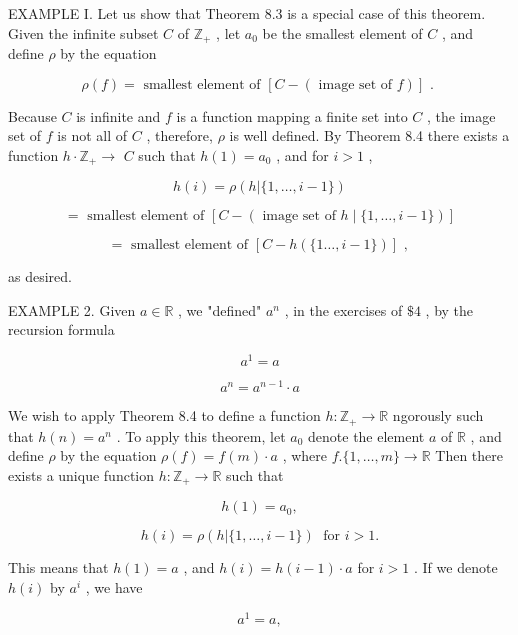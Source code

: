 EXAMPLE I. Let us show that Theorem 8.3 is a special case of this theorem. Given the infinite subset \(C\) of \({\mathbb{Z}}_{ + }\) , let \({a}_{0}\) be the smallest element of \(C\) , and define \(\rho\) by the equation

\[
\rho \left( f\right)  = \text{ smallest element of }\left\lbrack  {C - \left( {\text{ image set of }f}\right) }\right\rbrack  \text{ . }
\]

Because \(C\) is infinite and \(f\) is a function mapping a finite set into \(C\) , the image set of \(f\) is not all of \(C\) , therefore, \(\rho\) is well defined. By Theorem 8.4 there exists a function \(h \cdot  {\mathbb{Z}}_{ + } \rightarrow\)  \(C\) such that \(h\left( 1\right)  = {a}_{0}\) , and for \(i > 1\) ,

\[
h\left( i\right)  = \rho \left( {h|\{ 1,\ldots ,i - 1\} }\right)
\]

\[
= \text{ smallest element of }\left\lbrack  {C - \left( {\text{ image set of }h \mid  \{ 1,\ldots ,i - 1\} }\right) }\right\rbrack
\]

\[
= \text{ smallest element of }\left\lbrack  {C - h\left( {\{ 1\ldots ,i - 1\} }\right) }\right\rbrack  \text{ , }
\]

as desired.

EXAMPLE 2. Given \(a \in  \mathbb{R}\) , we "defined" \({a}^{n}\) , in the exercises of \(\$ 4\) , by the recursion formula

\[
{a}^{1} = a
\]

\[
{a}^{n} = {a}^{n - 1} \cdot  a
\]

We wish to apply Theorem 8.4 to define a function \(h : {\mathbb{Z}}_{ + } \rightarrow  \mathbb{R}\) ngorously such that \(h\left( n\right)  = {a}^{n}\) . To apply this theorem, let \({a}_{0}\) denote the element \(a\) of \(\mathbb{R}\) , and define \(\rho\) by the equation \(\rho \left( f\right)  = f\left( m\right)  \cdot  a\) , where \(f.\{ 1,\ldots ,m\}  \rightarrow  \mathbb{R}\) Then there exists a unique function \(h : {\mathbb{Z}}_{ + } \rightarrow  \mathbb{R}\) such that

\[
h\left( 1\right)  = {a}_{0},
\]

\[
h\left( i\right)  = \rho \left( {h|\{ 1,\ldots ,i - 1\} }\right) \;\text{ for }i > 1.
\]

This means that \(h\left( 1\right)  = a\) , and \(h\left( i\right)  = h\left( {i - 1}\right)  \cdot  a\) for \(i > 1\) . If we denote \(h\left( i\right)\) by \({a}^{i}\) , we have

\[
{a}^{1} = a,
\]

